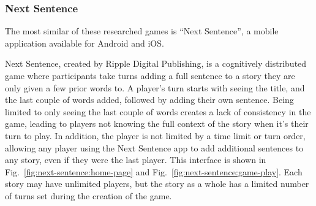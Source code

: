 \documentclass{sigchi}
\begin{document}
\subsubsection{Next Sentence}
The most similar of these researched games is ``Next Sentence'', a mobile application available for Android and iOS.   



Next Sentence, created by Ripple Digital Publishing, is a cognitively distributed game where participants take turns adding a full sentence to a story they are only given a few prior words to\cite{next-sentence-how}. A player's turn starts with seeing the title, and the last couple of words added, followed by adding their own sentence. Being limited to only seeing the last couple of words creates a lack of consistency in the game, leading to players not knowing the full context of the story when it's their turn to play. In addition, the player is not limited by a time limit or turn order, allowing any player using the Next Sentence app to add additional sentences to any story, even if they were the last player. This interface is shown in Fig.\@~\ref{fig:next-sentence:home-page} and Fig.\@~\ref{fig:next-sentence:game-play}. Each story may have unlimited players, but the story as a whole has a limited number of turns set during the creation of the game.


\end{document}
